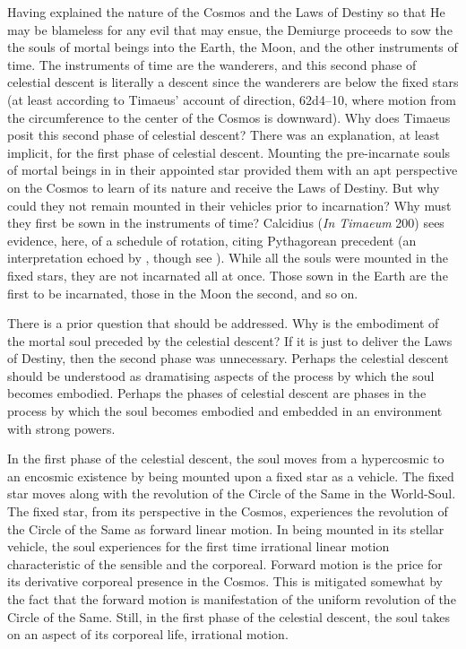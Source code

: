 Having explained the nature of the Cosmos and the Laws of Destiny so that He may be blameless for any evil that may ensue, the Demiurge proceeds to sow the the souls of mortal beings into the Earth, the Moon, and the other instruments of time. The instruments of time are the wanderers, and this second phase of celestial descent is literally a descent since the wanderers are below the fixed stars (at least according to Timaeus' account of direction, 62d4--10, where motion from the circumference to the center of the Cosmos is downward). Why does Timaeus posit this second phase of celestial descent? There was an explanation, at least implicit, for the first phase of celestial descent. Mounting the pre-incarnate souls of mortal beings in in their appointed star provided them with an apt perspective on the Cosmos to learn of its nature and receive the Laws of Destiny. But why could they not remain mounted in their vehicles prior to incarnation? Why must they first be sown in the instruments of time? Calcidius (\emph{In Timaeum} 200) sees evidence, here, of a schedule of rotation, citing Pythagorean precedent (an interpretation echoed by \citealt[146]{Cornford:1935fk}, though see \citealt[258--9]{Taylor:1928qb}). While all the souls were mounted in the fixed stars, they are not incarnated all at once. Those sown in the Earth are the first to be incarnated, those in the Moon the second, and so on. 

There is a prior question that should be addressed. Why is the embodiment of the mortal soul preceded by the celestial descent? If it is just to deliver the Laws of Destiny, then the second phase was unnecessary. Perhaps the celestial descent should be understood as dramatising aspects of the process by which the soul becomes embodied. Perhaps the phases of celestial descent are phases in the process by which the soul becomes embodied and embedded in an environment with strong powers. 

In the first phase of the celestial descent, the soul moves from a hypercosmic to an encosmic existence by being mounted upon a fixed star as a vehicle. The fixed star moves along with the revolution of the Circle of the Same in the World-Soul. The fixed star, from its perspective in the Cosmos, experiences the revolution of the Circle of the Same as forward linear motion. In being mounted in its stellar vehicle, the soul experiences for the first time irrational linear motion characteristic of the sensible and the corporeal. Forward motion is the price for its derivative corporeal presence in the Cosmos. This is mitigated somewhat by the fact that the forward motion is manifestation of the uniform revolution of the Circle of the Same. Still, in the first phase of the celestial descent, the soul takes on an aspect of its corporeal life, irrational motion. 

